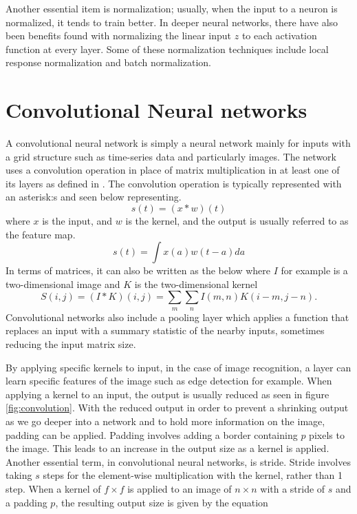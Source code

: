 Another essential item is normalization; usually, when the input to a neuron is normalized, it tends to train better. In deeper neural networks, there have also been benefits found with normalizing the linear input $z$ to each activation function at every layer. Some of these normalization techniques include local response normalization and batch normalization.



\section{Convolutional Neural networks}
A convolutional neural network is simply a neural network mainly for inputs with a grid structure such as time-series data and particularly images. The network uses a convolution operation in place of matrix multiplication in at least one of its layers as defined in \citep{Goodfellow-et-al-2016}. The convolution operation is typically represented with an asterisk:s  and seen below representing. 
\[ s(t) = (x * w)(t) \] 
where $x$ is the input, and $w$ is the kernel, and the output is usually referred to as the feature map.
\[ s(t) = \int x(a) w(t - a)da \] 
In terms of matrices, it can also be written as the below where $I$ for example is a two-dimensional image and $K$ is the two-dimensional kernel
\[S(i, j) = (I*K)(i, j) = \sum_m \sum_nI(m, n)K(i- m, j- n). \]
Convolutional networks also include a pooling layer which applies a function that replaces an input with a summary statistic of the nearby inputs, sometimes reducing the input matrix size.

By applying specific kernels to input, in the case of image recognition, a layer can learn specific features of the image such as edge detection for example. When applying a  kernel to an input, the output is usually reduced as seen in figure \ref{fig:convolution}. With the reduced output in order to prevent a shrinking output as we go deeper into a network and to hold more information on the image, padding can be applied. Padding involves adding a border containing $p$  pixels to the image.  This leads to an increase in the output size as a kernel is applied. Another essential term, in convolutional neural networks, is stride. Stride involves taking  $s$ steps for the element-wise multiplication with the kernel, rather than 1 step. When a kernel of $f \times f$  is applied to an image of  $n \times n $  with a stride of $s$ and a padding  $p$,  the resulting output size is given by the equation 

